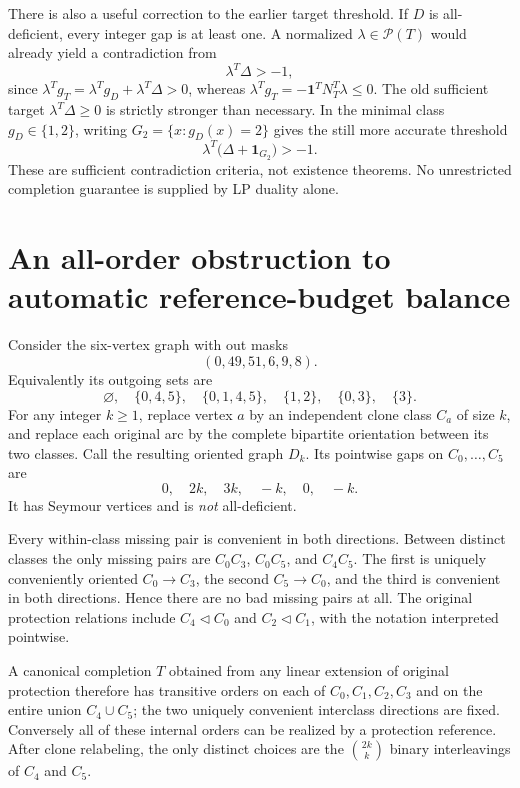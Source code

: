 There is also a useful correction to the earlier target threshold.
If $D$ is all-deficient, every integer gap is at least one. A normalized
$\lambda\in\mathcal P(T)$ would already yield a contradiction from
\begin{equation}
 \lambda^T\Delta>-1,
 \label{eq:transport-weaker-threshold}
\end{equation}
since $\lambda^Tg_T=\lambda^Tg_D+\lambda^T\Delta>0$, whereas
$\lambda^Tg_T=-\mathbf1^TN_T^T\lambda\le0$.
The old sufficient target $\lambda^T\Delta\ge0$ is strictly stronger
than necessary. In the minimal class $g_D\in\{1,2\}$, writing
$G_2=\{x:g_D(x)=2\}$ gives the still more accurate threshold
\[
 \lambda^T\bigl(\Delta+\mathbf1_{G_2}\bigr)>-1.
\]
These are sufficient contradiction criteria, not existence theorems.
No unrestricted completion guarantee is supplied by LP duality alone.

\section{An all-order obstruction to automatic reference-budget balance}
\label{sec:weighted-transport-infinite-obstruction}

Consider the six-vertex graph with out masks
\[
 (0,49,51,6,9,8).
\]
Equivalently its outgoing sets are
\[
 \varnothing,\quad\{0,4,5\},\quad\{0,1,4,5\},\quad
 \{1,2\},\quad\{0,3\},\quad\{3\}.
\]
For any integer $k\ge1$, replace vertex $a$ by an independent clone
class $C_a$ of size $k$, and replace each original arc by the complete
bipartite orientation between its two classes. Call the resulting
oriented graph $D_k$. Its pointwise gaps on $C_0,\ldots,C_5$ are
\[
 0,\quad 2k,\quad 3k,\quad-k,\quad0,\quad-k.
\]
It has Seymour vertices and is \emph{not} all-deficient.

Every within-class missing pair is convenient in both directions.
Between distinct classes the only missing pairs are $C_0C_3$,
$C_0C_5$, and $C_4C_5$. The first is uniquely conveniently oriented
$C_0\to C_3$, the second $C_5\to C_0$, and the third is convenient
in both directions. Hence there are no bad missing pairs at all.
The original protection relations include $C_4\triangleleft C_0$
and $C_2\triangleleft C_1$, with the notation interpreted pointwise.

A canonical completion $T$ obtained from any linear extension of
original protection therefore has transitive orders on each of
$C_0,C_1,C_2,C_3$ and on the entire union $C_4\cup C_5$; the two
uniquely convenient interclass directions are fixed. Conversely all
of these internal orders can be realized by a protection reference.
After clone relabeling, the only distinct choices are the
$\binom{2k}{k}$ binary interleavings of $C_4$ and $C_5$.

